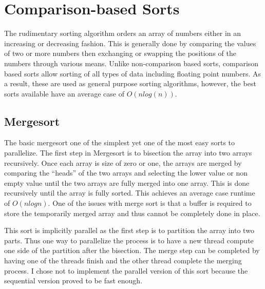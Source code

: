 \documentclass[11pt,letterpaper]{article}
\begin{document}
\section{Comparison-based Sorts}
The rudimentary sorting algorithm orders an array of numbers either in an
increasing or decreasing fashion.  This is generally done by comparing the
values of two or more numbers then exchanging or swapping the positions of the
numbers through various means.  Unlike non-comparison based sorts, comparison
based sorts allow sorting of all types of data including floating point numbers.
As a result, these are used as general purpose sorting algorithms, however, the
best sorts available have an average case of $O(n log(n))$.
\subsection{Mergesort}
The basic mergesort one of the simplest yet one of the most easy sorts to
parallelize.  The first step in Mergesort is to bisection the array into two
arrays recursively.  Once each array is size of zero or one, the arrays are
merged by comparing the “heads” of the two arrays and selecting the lower value
or non empty value until the two arrays are fully merged into one array.  This
is done recursively until the array is fully sorted.  This achieves an average
case runtime of $O(n logn)$.  One of the issues with merge sort is that a buffer
is required to store the temporarily merged array and thus cannot be completely
done in place.
\par
This sort is implicitly parallel as the first step is to partition the array
into two parts.  Thus one way to parallelize the process is to have a new thread
compute one side of the partition after the bisection.  The merge step can be
completed by having one of the threads finish and the other thread complete the
merging process.  I chose not to implement the parallel version of this sort
because the sequential version proved to be fast enough.
\end{document}
